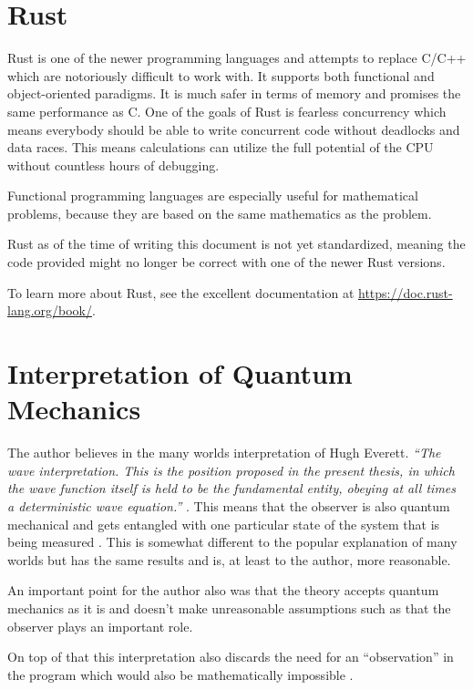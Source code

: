\documentclass[11pt,DIV=10,final]{scrreprt} %
\begin{document}
\section{Rust}
Rust is one of the newer programming languages and attempts to replace C/C++ which are notoriously difficult to work with. It supports both functional and object-oriented paradigms. It is much safer in terms of memory and promises the same performance as C. One of the goals of Rust is fearless concurrency which means everybody should
be able to write concurrent code without deadlocks and data races. This means calculations can utilize the full potential of the CPU without countless hours of debugging.

Functional programming languages are especially useful for mathematical problems, because they are based on the same mathematics as the problem.

Rust as of the time of writing this document is not yet standardized, meaning the code provided might no longer be correct with one of the newer Rust versions.

To learn more about Rust, see the excellent documentation at \url{https://doc.rust-lang.org/book/}.

\section{Interpretation of Quantum Mechanics}
The author believes in the many worlds interpretation of Hugh Everett. \emph{``The wave interpretation. This is the position proposed in the present thesis, in which the wave function itself is held to be
the fundamental entity, obeying at all times a deterministic wave equation.''} \citep[p. 115]{dewitt2015many}. This means that the observer is also quantum mechanical and gets entangled with one particular
state of the system that is being measured \citep[p. 116]{dewitt2015many}. This is somewhat different to the popular explanation of many worlds but has the same results and is, at least to the author,
more reasonable.

An important point for the author also was that the theory accepts quantum mechanics as it is and doesn't make unreasonable assumptions such as that the observer plays an important role.

On top of that this interpretation also discards the need for an ``observation'' in the program which would also be mathematically impossible \citep[p. 111]{dewitt2015many}.
\end{document}
